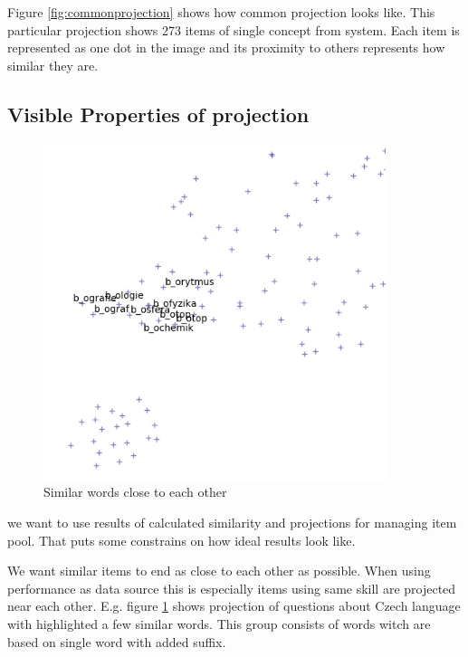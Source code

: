 \documentclass[
  digital, %
  table,   %
  nolof,     %
  nolot,     %
  nocover
]{fithesis3}
\begin{document}
Figure \ref{fig:commonprojection} shows how common projection looks
like. This particular projection shows 273 items of single concept from
system. Each item is represented as one dot in the image and its
proximity to others represents how similar they are.

\subsection{Visible Properties of
projection}\label{visible-properties-of-projection}



\begin{figure}
  \begin{center}
    \includegraphics[width=10cm]{img/similar_words}
  \end{center}
  \caption{Similar words close to each other}
  \label{similarwords}
\end{figure}

we want to use results of calculated similarity and projections for
managing item pool. That puts some constrains on how ideal results look
like.

We want similar items to end as close to each other as possible. When
using performance as data source this is especially items using same
skill are projected near each other. E.g. figure \ref{similarwords}
shows projection of questions about Czech language with highlighted a
few similar words. This group consists of words witch are based on
single word with added suffix.
\end{document}
